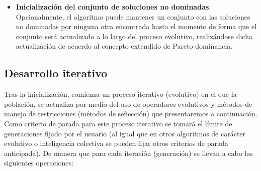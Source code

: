 \begin{itemize}
    \item \textbf{Inicialización del conjunto de soluciones no dominadas}. Opcionalmente, el algoritmo puede mantener un conjunto con las soluciones no dominadas por ninguna otra encontrada hasta el momento de forma que el conjunto será actualizado a lo largo del proceso evolutivo, realizándose dicha actualización de acuerdo al concepto extendido de Pareto-dominancia.\\
\end{itemize}

\subsection{Desarrollo iterativo}

Tras la inicialización, comienza un proceso iterativo (evolutivo) en el que la población, se actualiza por medio del uso de operadores evolutivos y métodos de manejo de restricciones (métodos de señección) que presentaremos a continuación. Como criterio de parada para este proceso iterativo se tomará el límite de generaciones fijado por el usuario (al igual que en otros algoritmos de carácter evolutivo o inteligencia colectiva se pueden fijar otros criterios de parada anticipada). De manera que para cada iteración (generación) se llevan a cabo las siguientes operaciones:\\

